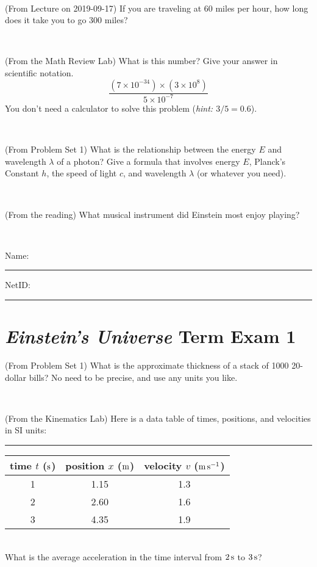 \documentclass[12pt, letterpaper]{article}
\begin{document}
\vfill ~


\clearpage


\begin{problem} (From Lecture on 2019-09-17)
If you are traveling at 60 miles per hour, how long does
it take you to go 300 miles?
\end{problem}


\vfill ~

\begin{problem} (From the Math Review Lab)
What is this number? Give your answer in scientific notation.
$$
\frac{(7\times10^{-34})\times(3\times10^8)}{5\times10^{-7}}
$$
You don't need a calculator to solve this problem (\textit{hint: $3/5=0.6$}).
\end{problem}


\vfill ~

\begin{problem} (From Problem Set 1)
What is the relationship between the energy $E$ and wavelength
$\lambda$ of a photon? Give a formula that involves energy $E$,
Planck's Constant $h$, the speed of light $c$, and wavelength
$\lambda$ (or whatever you need).
\end{problem}

\vfill ~

\begin{problem} (From the reading)
What musical instrument did Einstein most enjoy playing?
\end{problem}


\vfill ~


\cleardoublepage



\noindent
Name: \rule[-1ex]{0.60\textwidth}{0.1pt}
NetID: \rule[-1ex]{0.20\textwidth}{0.1pt}

\section*{\textsl{Einstein's Universe} Term Exam 1}
\setcounter{problem}{1}


\begin{problem} (From Problem Set 1)
What is the approximate thickness of a stack of 1000 20-dollar bills?
No need to be precise, and use any units you like.
\end{problem}


\vfill ~

\begin{problem} (From the Kinematics Lab)
Here is a data table of times, positions, and velocities in SI units:\\
\rule{1.0in}{0pt}\begin{tabular}{c|c|c}
time $t$ ($\mathrm{s}$) & position $x$ ($\mathrm{m}$) & velocity $v$ ($\mathrm{m}\,\mathrm{s}^{-1}$) \\
\hline
1 & 1.15 & 1.3 \\
2 & 2.60 & 1.6 \\
3 & 4.35 & 1.9 \\
\hline
\end{tabular}\\
What is the average acceleration in the time interval from $2\,\mathrm{s}$ to $3\,\mathrm{s}$?
\end{problem}
\end{document}
